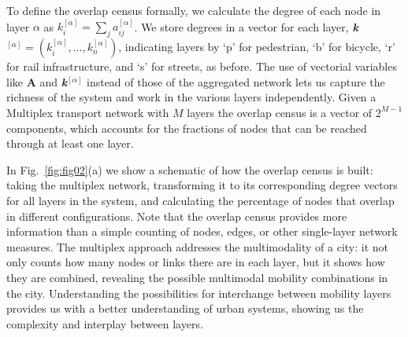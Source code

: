 To define the overlap census formally, we calculate the degree of each node in layer $\alpha$ as $ k_i^{[\alpha]}=\sum_ja_{ij}^{[\alpha]} $. We store degrees in a vector for each layer, \textbf{\textit{k}}$^{[\alpha]}=(k_i^{[\alpha]}, \dots, k_n^{[\alpha]})$, indicating layers by `p' for pedestrian, `b' for bicycle, `r' for rail infrastructure, and `s' for streets, as before. The use of vectorial variables like \textbf{A} and \textbf{\textit{k}}$^{[\alpha]}$ instead of those of the aggregated network lets us capture the richness of the system and work in the various layers independently. Given a Multiplex transport network with $M$ layers the overlap census is a vector of $2^{M-1}$ components, which accounts for the fractions of nodes that can be reached through at least one layer.

In Fig.~\ref{fig:fig02}(a) we show a schematic of how the overlap census is built: taking the multiplex network, transforming it to its corresponding degree vectors for all layers in the system, and calculating the percentage of nodes that overlap in different configurations. Note that the overlap census provides more information than a simple counting of nodes, edges, or other single-layer network measures. The multiplex approach addresses the multimodality of a city: it not only counts how many nodes or links there are in each layer, but it shows how they are combined, revealing the possible multimodal mobility combinations in the city. Understanding the possibilities for interchange between mobility layers provides us with a better understanding of urban systems, showing us the complexity and interplay between layers.

